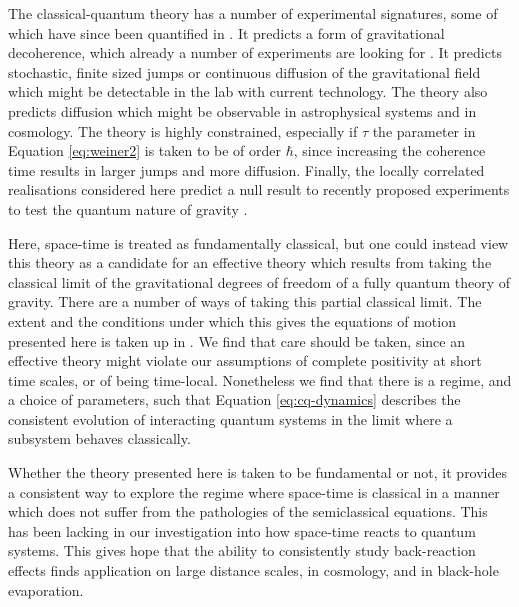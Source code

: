 \documentclass[aps,pra,showpacs,citeautoscript,amsmath,amssymb,floatfix,superscriptaddress,bbm, verbatim,amsfonts,changes,11pt,nofootinbib,longbibliography]{revtex4-2}
\newcommand{\foothide}[1]{\ignorespaces} %
\begin{document}
The classical-quantum theory has a number of experimental signatures, some of which have since been quantified in   \cite{oppenheim2021gravitationally}. It predicts a form of gravitational decoherence, which already a number of experiments are looking for \cite{bassi2013models,schmole2016micromechanical,carney2018massive}. %
It predicts stochastic, finite sized jumps\foothide{Here, space-time, as well as $g_{ab},\pi^{ab}$ are taken to be continuous, while the jumps in phase space are not. It's possible to imagine a theory in which the metric is discrete or even space-time itself, however, 
	there is no need to go this far in the present context.} or continuous diffusion of the gravitational field which might be detectable in the lab with current technology. 
The theory also predicts diffusion which might be observable in astrophysical systems and in cosmology. The theory is highly constrained, especially if $\tau$ the parameter in Equation \eqref{eq:weiner2} is taken to be of order $\hbar$, since increasing the coherence time results in larger jumps and more diffusion. 
Finally, the locally correlated realisations considered here predict a null result to recently proposed experiments to test the quantum nature of gravity \cite{kafri2013noise,bose2017spin,marletto2017gravitationally,entanglement_foot}. 

Here, space-time is treated as fundamentally classical, but one could instead  view this theory as  a candidate for an effective theory which results from taking the classical limit of the gravitational degrees of freedom of a fully quantum theory of gravity. 	There are a number of ways of taking this partial classical limit. The extent and the conditions under which this gives the equations of motion presented here is taken up in  \cite{UCLQQtoCQ}. We find that care should be taken, since an effective theory might violate our assumptions of complete positivity at short time scales, or of being time-local. Nonetheless we find that there is a regime, and a choice of parameters, such that Equation \eqref{eq:cq-dynamics} describes the consistent evolution of interacting quantum systems in the limit where a subsystem behaves classically.

 Whether the theory presented here is taken to be fundamental or not, it provides a consistent way to explore the regime where space-time is classical in a manner which does not suffer from the pathologies of the semiclassical equations.  This has been lacking in our investigation into how space-time reacts to quantum systems.  This gives hope that the ability to consistently study back-reaction effects finds application on large distance scales, in cosmology, and in black-hole evaporation. 
 
\end{document}
